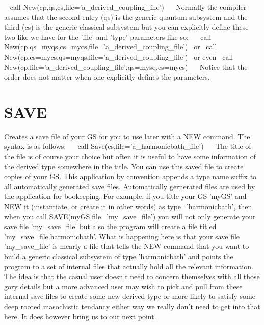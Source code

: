 ~\newline
 call New(cp,qs,cs,file='a\+\_\+derived\+\_\+coupling\+\_\+file')~\newline
~\newline
Normally the compiler assumes that the second entry (qs) is the generic quantum subsystem and the third (cs) is the generic classical subsystem but you can explicitly define these two like we have for the 'file' and 'type' parameters like so\+:~\newline
~\newline
 call New(cp,qs=myqs,cs=mycs,file='a\+\_\+derived\+\_\+coupling\+\_\+file')~\newline
or~\newline
 call New(cp,cs=mycs,qs=myqs,file='a\+\_\+derived\+\_\+coupling\+\_\+file')~\newline
or even~\newline
 call New(cp,file='a\+\_\+derived\+\_\+coupling\+\_\+file',qs=mysq,cs=mycs)~\newline
~\newline
Notice that the order does not matter when one explicitly defines the parameters.~\newline
\hypertarget{_interface_SAVE}{}\section{S\+A\+V\+E}\label{_interface_SAVE}
Creates a save file of your G\+S for you to use later with a N\+E\+W command. The syntax is as follows\+:~\newline
~\newline
 call Save(cs,file='a\+\_\+harmonicbath\+\_\+file')~\newline
~\newline
The title of the file is of course your choice but often it is useful to have some information of the derived type somewhere in the title. You can use this saved file to create copies of your G\+S. This application by convention appends a type name suffix to all automatically generated save files. Automatically gernerated files are used by the application for bookeeping. For example, if you title your G\+S 'my\+G\+S' and N\+E\+W it (instantiate, or create it in other words) as type='harmonicbath', then when you call S\+A\+V\+E(my\+G\+S,file='my\+\_\+save\+\_\+file') you will not only generate your save file 'my\+\_\+save\+\_\+file' but also the program will create a file titled 'my\+\_\+save\+\_\+file.\+harmonicbath'. What is happening here is that your save file 'my\+\_\+save\+\_\+file' is mearly a file that tells the N\+E\+W command that you want to build a generic classical subsystem of type 'harmonicbath' and points the program to a set of internal files that actually hold all the relevant information. The idea is that the casual user doesn't need to concern themselves with all those gory details but a more advanced user may wish to pick and pull from these internal save files to create some new derived type or more likely to satisfy some deep rooted masochistic tendancy either way we really don't need to get into that here. It does however bring us to our next point.~\newline

